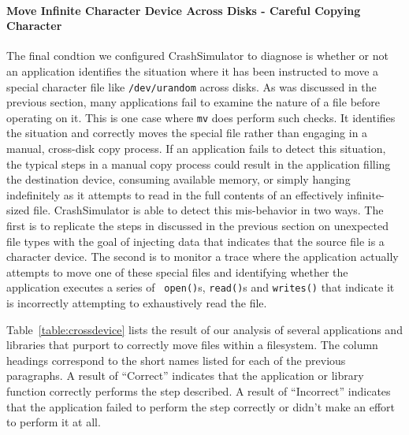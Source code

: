 \paragraph{Move Infinite Character Device Across Disks - Careful Copying Character}

The final condtion we configured CrashSimulator to diagnose is whether or not an
application identifies the situation where it has been instructed to move a
special character file like {\tt /dev/urandom} across disks.  As was discussed
in the previous section, many applications fail to examine the nature of a file
before operating on it.  This is one case where {\tt mv} does perform such
checks.  It identifies the situation and correctly moves the special file rather
than engaging in a manual, cross-disk copy process.  If an application fails to
detect this situation, the typical steps in a manual copy process could result
in the application filling the destination device, consuming available memory,
or simply hanging indefinitely as it attempts to read in the full contents of an
effectively infinite-sized file.  CrashSimulator is able to detect this
mis-behavior in two ways.  The first is to replicate the steps in discussed in
the previous section on unexpected file types with the goal of injecting data
that indicates that the source file is a character device.  The second is to
monitor a trace where the application actually attempts to move one of these
special files and identifying whether the application executes a series of {\tt
  open()}s, {\tt read()}s and {\tt writes()} that indicate it is incorrectly
attempting to exhaustively read the file.

Table~\ref{table:crossdevice} lists the result of our analysis of several applications
and libraries that purport to correctly move files within a filesystem.  The
column headings correspond to the short names listed for each of the previous
paragraphs. A result of ``Correct'' indicates that the application or library
function correctly performs the step described.  A result of ``Incorrect''
indicates that the application failed to perform the step correctly or didn't
make an effort to perform it at all.


